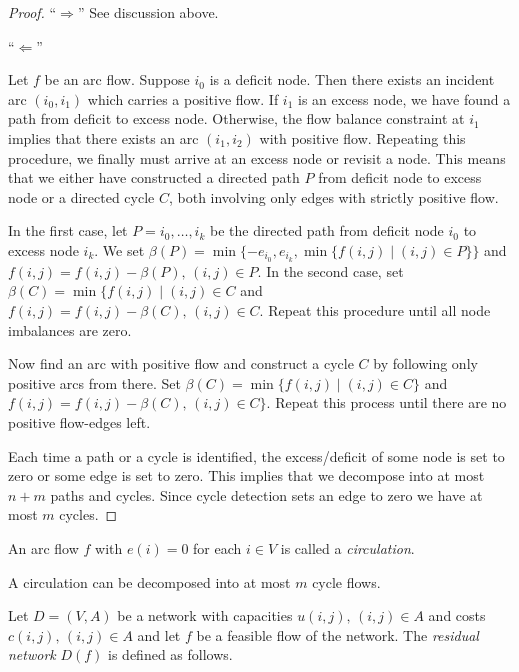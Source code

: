   \begin{proof}
   
  
  ``$\Rightarrow$'' See discussion above.
  
  ``$\Leftarrow$'' 
  
  Let $f$ be an arc flow. Suppose $i_0$ is a deficit node. Then there
  exists an incident arc $(i_0,i_1)$ which carries a positive flow. If
  $i_1$ is an excess node, we have found a path from deficit to excess
  node. Otherwise, the flow balance constraint at $i_1$ implies that
  there exists an arc $(i_1,i_2)$ with positive flow. Repeating this
  procedure, we finally must arrive at an excess node or revisit a
  node. This means that we either have constructed a directed path $P$
  from deficit node to excess node or a directed cycle $C$, both
  involving only edges with strictly positive flow.
  
  In the first case, let $P = i_0,\ldots,i_k$ be the directed path from
  deficit node $i_0$ to excess node $i_k$. We set $\beta(P) =
  \min\{-e_{i_0}, e_{i_k}, \min\{f{(i,j)} \mid (i,j) \in P\} \}$ and $f{(i,j)} =
  f{(i,j)} - \beta(P), \, (i,j) \in P$.  In the second case, set $\beta(C) =
  \min\{f{(i,j)} \mid (i,j) \in C$ and $f{(i,j)} = f{(i,j)} - \beta(C), \, (i,j)
  \in C$.  Repeat this procedure until all node imbalances are zero.
  
  Now find an arc with positive flow and construct a cycle $C$ by
  following only positive arcs from there. Set 
  $\beta(C) = \min\{f{(i,j)} \mid  (i,j) \in C\}$ and 
  $f{(i,j)} = f{(i,j)} - \beta(C),\, (i,j) \in C\}$. Repeat this process until
  there are no positive flow-edges left. 

  Each time a path or a cycle is identified, the excess/deficit of
  some node is set to zero or some edge is set to zero. This implies
  that we decompose into at most $n+m$ paths and cycles. Since cycle
  detection sets an edge to zero we have at most $m$ cycles. 
\end{proof}
  
  An arc flow $f$ with $e(i)=0$ for each $i \in V$ is called a
  \emph{circulation}. 
  
  \begin{corollary}
    A circulation can be decomposed into at most $m$ cycle flows.
  \end{corollary}

  
  Let $D = (V,A)$ be a network with capacities 
  $u{(i,j)}, \,  (i,j) \in A$ and costs $c{(i,j)}, \, (i,j) \in A$ and let
  $f$ be a feasible flow of the network. The \emph{residual network} $D(f)$ is
  defined as follows.

